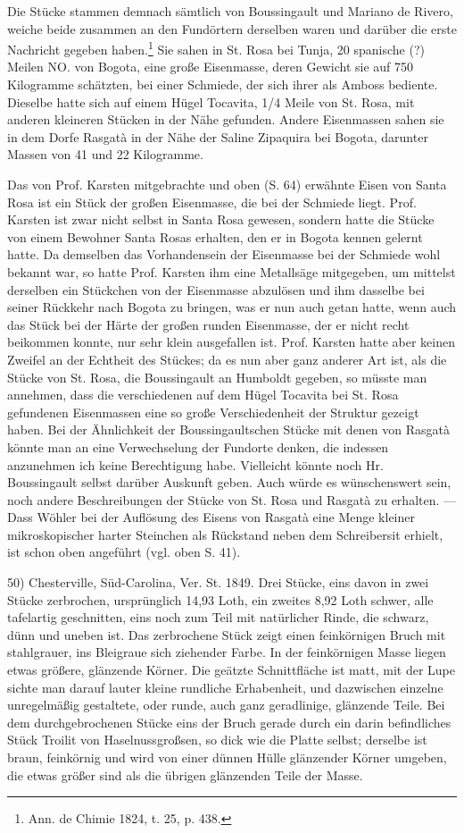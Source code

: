 \documentclass[a4paper, 11pt, oneside]{article}
\begin{document}
Die Stücke stammen demnach sämtlich von Boussingault und Mariano de Rivero, weiche beide zusammen an den Fundörtern derselben waren und darüber die erste Nachricht gegeben haben.\footnote{Ann. de Chimie 1824, t. 25, p. 438.} Sie sahen in St. Rosa bei Tunja, 20 spanische (?) Meilen NO. von Bogota, eine große Eisenmasse, deren Gewicht sie auf 750 Kilogramme schätzten, bei einer Schmiede, der sich ihrer als Amboss bediente. Dieselbe hatte sich auf einem Hügel Tocavita, 1/4 Meile von St. Rosa, mit anderen kleineren Stücken in der Nähe gefunden. Andere Eisenmassen sahen sie in dem Dorfe Rasgatà in der Nähe der Saline Zipaquira bei Bogota, darunter Massen von 41 und 22 Kilogramme.

Das von Prof. Karsten mitgebrachte und oben (S. 64) erwähnte Eisen von Santa Rosa ist ein Stück der großen Eisenmasse, die bei der Schmiede liegt. Prof. Karsten ist zwar nicht selbst in Santa Rosa gewesen, sondern hatte die Stücke von einem Bewohner Santa Rosas erhalten, den er in Bogota kennen gelernt hatte. Da demselben das Vorhandensein der Eisenmasse bei der Schmiede wohl bekannt war, so hatte Prof. Karsten ihm eine Metallsäge mitgegeben, um mittelst derselben ein Stückchen von der Eisenmasse abzulösen und ihm dasselbe bei seiner Rückkehr nach Bogota zu bringen, was er nun auch getan hatte, wenn auch das Stück bei der Härte der großen runden Eisenmasse, der er nicht recht beikommen konnte, nur sehr klein ausgefallen ist. Prof. Karsten hatte aber keinen Zweifel an der Echtheit des Stückes; da es nun aber ganz anderer Art ist, als die Stücke von St. Rosa, die Boussingault an Humboldt gegeben, so müsste man annehmen, dass die verschiedenen auf dem Hügel Tocavita bei St. Rosa gefundenen Eisenmassen eine so große Verschiedenheit der Struktur gezeigt haben. Bei der Ähnlichkeit der Boussingaultschen Stücke mit denen von Rasgatà könnte man an eine Verwechselung der Fundorte denken, die indessen anzunehmen ich keine Berechtigung habe. Vielleicht könnte noch Hr. Boussingault selbst darüber Auskunft geben. Auch würde es wünschenswert sein, noch andere Beschreibungen der Stücke von St. Rosa und Rasgatà zu erhalten. --- Dass Wöhler bei der Auflösung des Eisens von Rasgatà eine Menge kleiner mikroskopischer harter Steinchen als Rückstand neben dem Schreibersit erhielt, ist schon oben angeführt (vgl. oben S. 41).

50) Chesterville, Süd-Carolina, Ver. St. 1849. Drei Stücke, eins davon in zwei Stücke zerbrochen, ursprünglich 14,93 Loth, ein zweites 8,92 Loth schwer, alle tafelartig geschnitten, eins noch zum Teil mit natürlicher Rinde, die schwarz, dünn und uneben ist. Das zerbrochene Stück zeigt einen feinkörnigen Bruch mit stahlgrauer, ins Bleigraue sich ziehender Farbe. In der feinkörnigen Masse liegen etwas größere, glänzende Körner. Die geätzte Schnittfläche ist matt, mit der Lupe sichte man darauf lauter kleine rundliche Erhabenheit, und dazwischen einzelne unregelmäßig gestaltete, oder runde, auch ganz geradlinige, glänzende Teile. Bei dem durchgebrochenen Stücke eins der Bruch gerade durch ein darin befindliches Stück Troilit von Haselnussgroßsen, so dick wie die Platte selbst; derselbe ist braun, feinkörnig und wird von einer dünnen Hülle glänzender Körner umgeben, die etwas größer sind als die übrigen glänzenden Teile der Masse.
\end{document}
